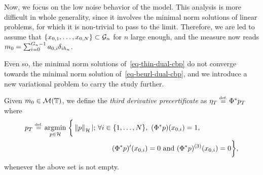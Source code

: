 Now, we focus on the low noise behavior of the model. This analysis is more difficult in whole generality, since it involves the minimal norm solutions of linear problems, for which it is non-trivial to pass to the limit. Therefore, we are led to assume that $\{x_{0,1}, \ldots , x_{0,N} \}\subset \mathcal{G}_n$ for $n$ large enough, and the measure now reads $m_0=\sum_{i=0}^{{G_n}-1} a_{0,i} \delta_{i{h_n}}$.

Even so, the minimal norm solutions of~\eqref{eq-thin-dual-cbp} do not converge towards the minimal norm solution of~\eqref{eq-beurl-dual-cbp}, and we introduce a new variational problem to carry the study further.


\begin{defn}\label{defn-third-deriv-precertif}
Given $m_0\in \mathcal{M}(\mathbb{T})$, we define the \textit{third derivative precertificate} as $\eta_T \stackrel{\mbox{\upshape\tiny def.}}{=} \Phi^*p_T$ where 
  \begin{align}
    p_T \stackrel{\mbox{\upshape\tiny def.}}{=} \underset{p\in\mathcal{H}}{\operatorname{argmin}}\;\bigg{\{}\left\lVert p \right\rVert_{\mathcal{H}}|; \ & \forall i\in \{1,\ldots, N\},\ (\Phi^*p)(x_{0,i})=1, \nonumber\\
                                                  &  \quad \quad (\Phi^*p)'(x_{0,i})=0 \mbox{ and } (\Phi^*p)^{(3)}(x_{0,i})=0 \bigg{\}}, \label{eq-def-thirdderivcertif}
  \end{align}
whenever the above set is not empty.
\end{defn}

